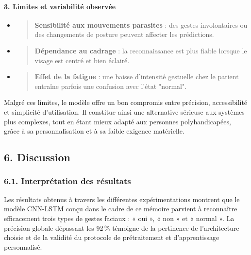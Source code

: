 \documentclass[
]{article}
\begin{document}
\hypertarget{limites-et-variabilituxe9-observuxe9e}{%
\paragraph{\texorpdfstring{\textbf{3. Limites et variabilité observée}}{3. Limites et variabilité observée}}\label{limites-et-variabilituxe9-observuxe9e}}

\begin{itemize}
\item
  \begin{quote}
  \textbf{Sensibilité aux mouvements parasites} : des gestes involontaires ou des changements de posture peuvent affecter les prédictions.
  \end{quote}
\item
  \begin{quote}
  \textbf{Dépendance au cadrage} : la reconnaissance est plus fiable lorsque le visage est centré et bien éclairé.
  \end{quote}
\item
  \begin{quote}
  \textbf{Effet de la fatigue} : une baisse d'intensité gestuelle chez le patient entraîne parfois une confusion avec l'état "normal".
  \end{quote}
\end{itemize}

Malgré ces limites, le modèle offre un bon compromis entre précision, accessibilité et simplicité d'utilisation. Il constitue ainsi une alternative sérieuse aux systèmes plus complexes, tout en étant mieux adapté aux personnes polyhandicapées, grâce à sa personnalisation et à sa faible exigence matérielle.

\hypertarget{discussion}{%
\subsection{6. Discussion}\label{discussion}}

\hypertarget{interpruxe9tation-des-ruxe9sultats}{%
\subsubsection{6.1. Interprétation des résultats}\label{interpruxe9tation-des-ruxe9sultats}}

Les résultats obtenus à travers les différentes expérimentations montrent que le modèle CNN-LSTM conçu dans le cadre de ce mémoire parvient à reconnaître efficacement trois types de gestes faciaux : « oui », « non » et « normal ». La précision globale dépassant les 92\,\% témoigne de la pertinence de l'architecture choisie et de la validité du protocole de prétraitement et d'apprentissage personnalisé.
\end{document}
